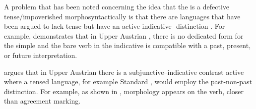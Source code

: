 \documentclass[output=paper,modfonts,newtxmath,hidelinks,]{langscibook}
\begin{document}
A problem that has been noted concerning the idea that the  is a defective tense/impoverished morphosyntactically is that there are languages that have been argued to lack tense but have an active indicative- distinction \citep{Wiltschko}. For example, \citet{Wiltschko} demonstrates that in Upper Austrian , there is no dedicated form for the simple  and the bare verb in the indicative is compatible with a past, present, or future interpretation.

\ea \label{10:ex19}
	\z
\z

\noindent \citet{Wiltschko} argues that in Upper Austrian  there is a subjunctive--indicative contrast active where a tensed language, for example Standard , would employ the past-non-past distinction. For example, as shown in ,  morphology appears on the verb, closer than agreement marking.

\ea \label{10:ex20}
	\z
\z
\end{document}
